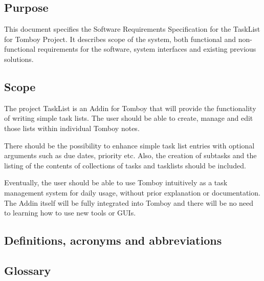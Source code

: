 \subsection{Purpose}
\label{intro:purpose}
This document specifies the Software Requirements Specification for the TaskList for Tomboy Project.
It describes scope of the system, both functional and non-functional requirements for the software, system interfaces and existing previous solutions.


\subsection{Scope}
\label{intro:scope}
The project TaskList is an Addin for Tomboy that will provide the functionality of writing simple task lists. The user should be able to create, manage and edit those lists within individual Tomboy notes.

There should be the possibility to enhance simple task list entries with optional arguments such as due dates, priority etc. Also, the creation of subtasks and the listing of the contents of collections of tasks and tasklists should be included.

Eventually, the user should be able to use Tomboy intuitively as a task management system for daily usage, without prior explanation or documentation. The Addin itself will be fully integrated into Tomboy and there will be no need to learning how to use new tools or GUIs.

\subsection{Definitions, acronyms and abbreviations}
\label{intro:definitions}

\begin{objects}
\end{objects}


\subsection{Glossary}
\label{intro:glossary}

